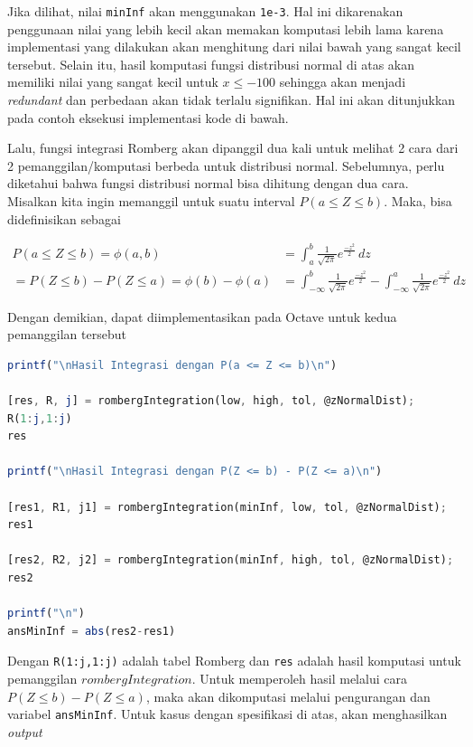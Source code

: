 \documentclass[journal,12pt,onecolumn,a4paper]{IEEEtran}
\begin{document}
Jika dilihat, nilai \lstinline{minInf} akan menggunakan \lstinline{1e-3}. Hal ini dikarenakan penggunaan nilai yang lebih kecil akan memakan komputasi lebih lama karena implementasi yang dilakukan akan menghitung dari nilai bawah yang sangat kecil tersebut. Selain itu, hasil komputasi fungsi distribusi normal di atas akan memiliki nilai yang sangat kecil untuk \(x \le -100\) sehingga akan menjadi \emph{redundant} dan perbedaan akan tidak terlalu signifikan. Hal ini akan ditunjukkan pada contoh eksekusi implementasi kode di bawah.

Lalu, fungsi integrasi Romberg akan dipanggil dua kali untuk melihat 2 cara dari 2 pemanggilan/komputasi berbeda untuk distribusi normal. Sebelumnya, perlu diketahui bahwa fungsi distribusi normal bisa dihitung dengan dua cara. Misalkan kita ingin memanggil untuk suatu interval \(P(a \le Z \le b)\). Maka, bisa didefinisikan sebagai

\begin{equation*}
	\begin{split}
		P(a \le Z \le b )  = \phi(a,b) & = \int_{a}^{b} \frac{1}{\sqrt{2\pi}}e ^{\frac{-z^2}{2}} \,dz \\
		=  P(Z \le b ) - P(Z \le a )  = \phi(b)-\phi(a) & =  \int_{-\infty}^{b} \frac{1}{\sqrt{2\pi}}e ^{\frac{-z^2}{2}} - \int_{-\infty}^{a} \frac{1}{\sqrt{2\pi}}e ^{\frac{-z^2}{2}} \,dz
	\end{split}
\end{equation*}

Dengan demikian, dapat diimplementasikan pada Octave untuk kedua pemanggilan tersebut

\begin{center}
	\begin{lstlisting}[language=Octave]
printf("\nHasil Integrasi dengan P(a <= Z <= b)\n")

[res, R, j] = rombergIntegration(low, high, tol, @zNormalDist);
R(1:j,1:j)
res

printf("\nHasil Integrasi dengan P(Z <= b) - P(Z <= a)\n")

[res1, R1, j1] = rombergIntegration(minInf, low, tol, @zNormalDist);
res1

[res2, R2, j2] = rombergIntegration(minInf, high, tol, @zNormalDist);
res2

printf("\n")
ansMinInf = abs(res2-res1)
	\end{lstlisting}
\end{center}

Dengan \lstinline{R(1:j,1:j)} adalah tabel Romberg dan \lstinline{res} adalah hasil komputasi untuk pemanggilan \(rombergIntegration\). Untuk memperoleh hasil melalui cara \(P(Z \le b ) - P(Z \le a )\), maka akan dikomputasi melalui pengurangan dan variabel \lstinline{ansMinInf}. Untuk kasus dengan spesifikasi di atas, akan menghasilkan \emph{output}
\end{document}
